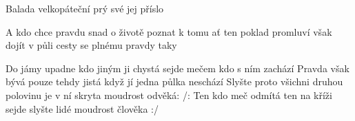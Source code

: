 \begin{TEXT}{Balada velkopáteční}
\SLOKA {}  prý\NL
{} své 
 jej  příslo\NL

A kdo chce pravdu snad\NL
o životě poznat\NL
k tomu ať ten poklad promluví\NL
{} však  dojít \NL
{} v půli cesty \NL
{} se   plnému \NL
{} pravdy  taky 

\SLOKA Do jámy upadne\NL
kdo jiným ji chystá\NL
sejde mečem kdo s ním zachází\NL
Pravda však bývá\NL
pouze tehdy jistá\NL
když jí jedna půlka neschází\NL
Slyšte proto všichni druhou polovinu\NL
je v ní skryta moudrost odvěká:\NL
/: Ten kdo meč odmítá ten na kříži sejde\NL
slyšte lidé moudrost člověka :/
\end{TEXT}